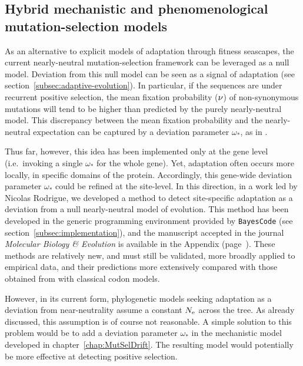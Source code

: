 \subsection{Hybrid mechanistic and phenomenological mutation-selection models}
\label{subsec:hybrid-mechanistic-and-phenomenological-mutation-selection-models}

As an alternative to explicit models of adaptation through fitness seascapes, the current \gls{nearly-neutral} mutation-selection framework can be leveraged as a null model.
Deviation from this null model can be seen as a signal of adaptation (see section~\ref{subsec:adaptive-evolution}).
In particular, if the sequences are under recurrent positive selection, the mean fixation probability ($\nu$) of \gls{non-synonymous} mutations will tend to be higher than predicted by the purely \gls{nearly-neutral} model.
This discrepancy between the mean fixation probability and the \gls{nearly-neutral} expectation can be captured by a deviation parameter $\omega_*$, as in \citet{Rodrigue2016}.

Thus far, however, this idea has been implemented only at the gene level (i.e.~invoking a single $\omega_*$ for the whole gene).
Yet, adaptation often occurs more locally, in specific domains of the protein.
Accordingly, this gene-wide deviation parameter $\omega_*$ could be refined at the site-level.
In this direction, in a work led by Nicolas Rodrigue, we developed a method to detect site-specific adaptation as a deviation from a null \gls{nearly-neutral} model of evolution.
This method has been developed in the generic programming environment provided by \texttt{BayesCode} (see section~\ref{subsec:implementation}), and the manuscript accepted in the journal \textit{Molecular Biology \& Evolution} is available in the Appendix (page~\pageref{sec-appendix:MutSelM3starMBE}).
These methods are relatively new, and must still be validated, more broadly applied to empirical data, and their predictions more extensively compared with those obtained from with classical \gls{codon} models.

However, in its current form, phylogenetic models seeking adaptation as a deviation from near-neutrality assume a constant $N_{\text{e}}$ across the tree.
As already discussed, this assumption is of course not reasonable.
A simple solution to this problem would be to add a deviation parameter $\omega_*$ in the mechanistic model developed in chapter~\ref{chap:MutSelDrift}.
The resulting model would potentially be more effective at detecting positive selection.

